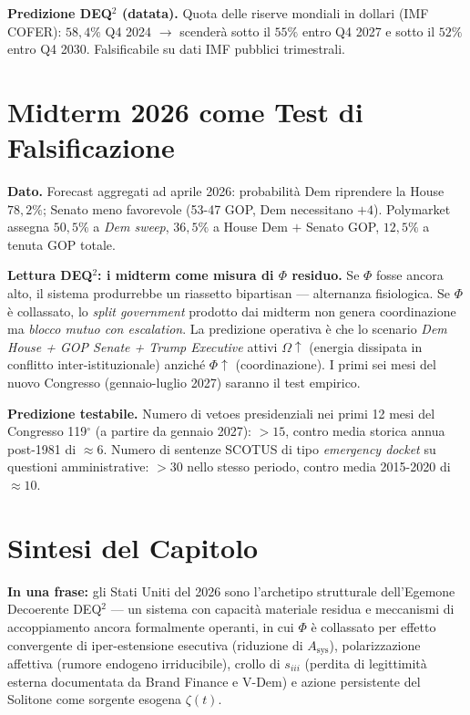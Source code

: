 \Conj{} \textbf{Predizione DEQ$^2$ (datata).} Quota delle riserve mondiali
in dollari (IMF COFER): \(58{,}4\%\) Q4 2024 \(\to\) scenderà sotto il
\(55\%\) entro Q4 2027 e sotto il \(52\%\) entro Q4 2030. Falsificabile
su dati IMF pubblici trimestrali.



\section{Midterm 2026 come Test di
Falsificazione}\label{midterm-2026-come-test-di-falsificazione}

\Proved{} \textbf{Dato.} Forecast aggregati ad aprile 2026: probabilità
Dem riprendere la House \(78{,}2\%\); Senato meno favorevole (53-47 GOP,
Dem necessitano \(+4\)). Polymarket assegna \(50{,}5\%\) a \emph{Dem
sweep}, \(36{,}5\%\) a House Dem \(+\) Senato GOP, \(12{,}5\%\) a tenuta
GOP totale.

\Hypoth{} \textbf{Lettura DEQ$^2$: i midterm come misura di \(\Phi\)
residuo.} Se \(\Phi\) fosse ancora alto, il sistema produrrebbe un
riassetto bipartisan --- alternanza fisiologica. Se \(\Phi\) è
collassato, lo \emph{split government} prodotto dai midterm non genera
coordinazione ma \emph{blocco mutuo con escalation}. La predizione
operativa è che lo scenario \emph{Dem House + GOP Senate + Trump
Executive} attivi \(\Omega \uparrow\) (energia dissipata in conflitto
inter-istituzionale) anziché \(\Phi \uparrow\) (coordinazione). I primi
sei mesi del nuovo Congresso (gennaio-luglio 2027) saranno il test
empirico.

\Conj{} \textbf{Predizione testabile.} Numero di vetoes presidenziali
nei primi 12 mesi del Congresso 119$^\circ$ (a partire da gennaio 2027):
\(> 15\), contro media storica annua post-1981 di \(\approx 6\). Numero
di sentenze SCOTUS di tipo \emph{emergency docket} su questioni
amministrative: \(> 30\) nello stesso periodo, contro media 2015-2020 di
\(\approx 10\).



\section{Sintesi del Capitolo}\label{sintesi-del-capitolo}

\Proved{} \textbf{In una frase:} gli Stati Uniti del 2026 sono
l'archetipo strutturale dell'Egemone Decoerente DEQ$^2$ --- un sistema con
capacità materiale residua e meccanismi di accoppiamento ancora
formalmente operanti, in cui \(\Phi\) è collassato per effetto
convergente di iper-estensione esecutiva (riduzione di
\(A_{\text{sys}}\)), polarizzazione affettiva (rumore endogeno
irriducibile), crollo di \(s_{iii}\) (perdita di legittimità esterna
documentata da Brand Finance e V-Dem) e azione persistente del Solitone
come sorgente esogena \(\zeta(t)\).

